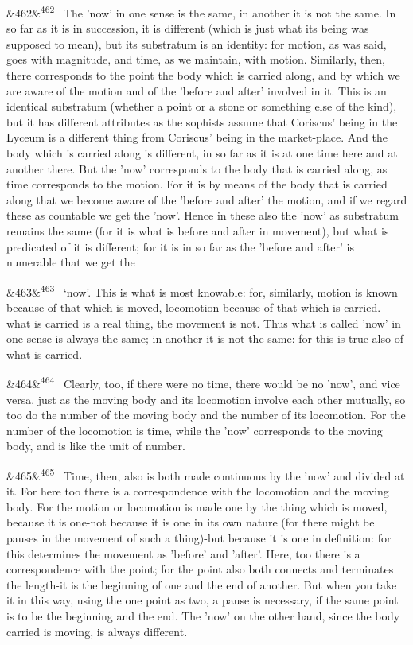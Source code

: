 \documentclass[12pt]{article}
\newcommand{\para}[1][]{\par\noindent\ifx&#1&\else\textsuperscript{\footnotesize #1}~\fi}
\begin{document}
\para[462] The 'now' in one sense is the same, in another it is not the same. In so far as it is in succession, it is different (which is just what its being was supposed to mean), but its substratum is an identity: for motion, as was said, goes with magnitude, and time, as we maintain, with motion. Similarly, then, there corresponds to the point the body which is carried along, and by which we are aware of the motion and of the 'before and after' involved in it. This is an identical substratum (whether a point or a stone or something else of the kind), but it has different attributes as the sophists assume that Coriscus' being in the Lyceum is a different thing from Coriscus' being in the market-place. And the body which is carried along is different, in so far as it is at one time here and at another there. But the 'now' corresponds to the body that is carried along, as time corresponds to the motion. For it is by means of the body that is carried along that we become aware of the 'before and after’ the motion, and if we regard these as countable we get the 'now'. Hence in these also the 'now' as substratum remains the same (for it is what is before and after in movement), but what is predicated of it is different; for it is in so far as the 'before and after’ is numerable that we get the

\para[463] ‘now’. This is what is most knowable: for, similarly, motion is known because of that which is moved, locomotion because of that which is carried. what is carried is a real thing, the movement is not. Thus what is called 'now' in one sense is always the same; in another it is not the same: for this is true also of what is carried.

\para[464] Clearly, too, if there were no time, there would be no 'now’, and vice versa. just as the moving body and its locomotion involve each other mutually, so too do the number of the moving body and the number of its locomotion. For the number of the locomotion is time, while the 'now' corresponds to the moving body, and is like the unit of number.

\para[465] Time, then, also is both made continuous by the 'now' and divided at it. For here too there is a correspondence with the locomotion and the moving body. For the motion or locomotion is made one by the thing which is moved, because it is one-not because it is one in its own nature (for there might be pauses in the movement of such a thing)-but because it is one in definition: for this determines the movement as 'before' and 'after'. Here, too there is a correspondence with the point; for the point also both connects and terminates the length-it is the beginning of one and the end of another. But when you take it in this way, using the one point as two, a pause is necessary, if the same point is to be the beginning and the end. The 'now' on the other hand, since the body carried is moving, is always different.
\end{document}
